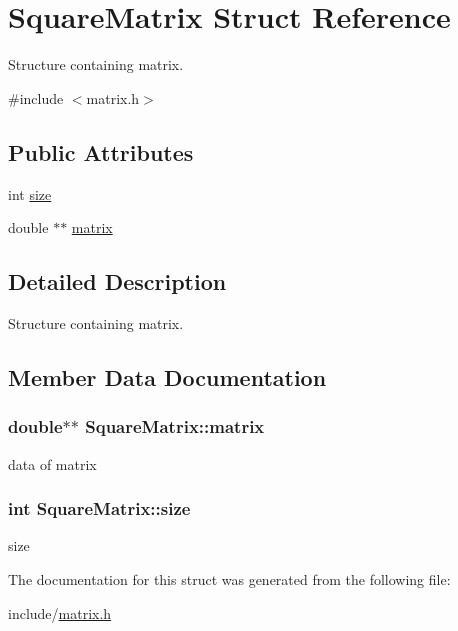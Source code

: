 \hypertarget{structSquareMatrix}{\section{\-Square\-Matrix \-Struct \-Reference}
\label{structSquareMatrix}
}


\-Structure containing matrix.  




{\ttfamily \#include $<$matrix.\-h$>$}

\subsection*{\-Public \-Attributes}
\begin{DoxyCompactItemize}
\item 
int \hyperlink{structSquareMatrix_aea5128d136b85d7b2179419f7759a2f9}{size}
\item 
double $\ast$$\ast$ \hyperlink{structSquareMatrix_a110bf1ac8d92d943e29f0fa245fb0cfb}{matrix}
\end{DoxyCompactItemize}


\subsection{\-Detailed \-Description}
\-Structure containing matrix. 

\subsection{\-Member \-Data \-Documentation}
\hypertarget{structSquareMatrix_a110bf1ac8d92d943e29f0fa245fb0cfb}{
\subsubsection[{matrix}]{\setlength{\rightskip}{0pt plus 5cm}double$\ast$$\ast$ {\bf \-Square\-Matrix\-::matrix}}}\label{structSquareMatrix_a110bf1ac8d92d943e29f0fa245fb0cfb}
data of matrix \hypertarget{structSquareMatrix_aea5128d136b85d7b2179419f7759a2f9}{
\subsubsection[{size}]{\setlength{\rightskip}{0pt plus 5cm}int {\bf \-Square\-Matrix\-::size}}}\label{structSquareMatrix_aea5128d136b85d7b2179419f7759a2f9}
size 

\-The documentation for this struct was generated from the following file\-:\begin{DoxyCompactItemize}
\item 
include/\hyperlink{matrix_8h}{matrix.\-h}\end{DoxyCompactItemize}
